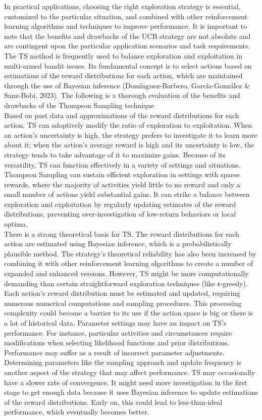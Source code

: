 \documentclass[a4paper,11pt,onecolumn]{article}
\begin{document}
In practical applications, choosing the right exploration strategy is essential, customized to the particular situation, and combined with other reinforcement learning algorithms and techniques to improve performance. It is important to note that the benefits and drawbacks of the UCB strategy are not absolute and are contingent upon the particular application scenarios and task requirements. The TS method is frequently used to balance exploration and exploitation in multi-armed bandit issues. Its fundamental concept is to select actions based on estimations of the reward distributions for each action, which are maintained through the use of Bayesian inference (Domínguez-Barbero, García-González & Sanz-Bobi, 2023). The following is a thorough evaluation of the benefits and drawbacks of the Thompson Sampling technique\\
Based on past data and approximations of the reward distributions for each action, TS can adaptively modify the ratio of exploration to exploitation. When an action's uncertainty is high, the strategy prefers to investigate it to learn more about it; when the action's average reward is high and its uncertainty is low, the strategy tends to take advantage of it to maximize gains. Because of its versatility, TS can function effectively in a variety of settings and situations. Thompson Sampling can sustain efficient exploration in settings with sparse rewards, where the majority of activities yield little to no reward and only a small number of actions yield substantial gains. It can strike a balance between exploration and exploitation by regularly updating estimates of the reward distributions, preventing over-investigation of low-return behaviors or local optima.\\
There is a strong theoretical basis for TS. The reward distributions for each action are estimated using Bayesian inference, which is a probabilistically plausible method. The strategy's theoretical reliability has also been increased by combining it with other reinforcement learning algorithms to create a number of expanded and enhanced versions.
However, TS might be more computationally demanding than certain straightforward exploration techniques (like ε-greedy). Each action's reward distribution must be estimated and updated, requiring numerous numerical computations and sampling procedures. This processing complexity could become a barrier to its use if the action space is big or there is a lot of historical data.  Parameter settings may have an impact on TS's performance. For instance, particular activities and circumstances require modifications when selecting likelihood functions and prior distributions. Performance may suffer as a result of incorrect parameter adjustments. Determining parameters like the sampling approach and update frequency is another aspect of the strategy that may affect performance. TS may occasionally have a slower rate of convergence. It might need more investigation in the first stage to get enough data because it uses Bayesian inference to update estimations of the reward distributions. Early on, this could lead to less-than-ideal performance, which eventually becomes better.\\
\end{document}
